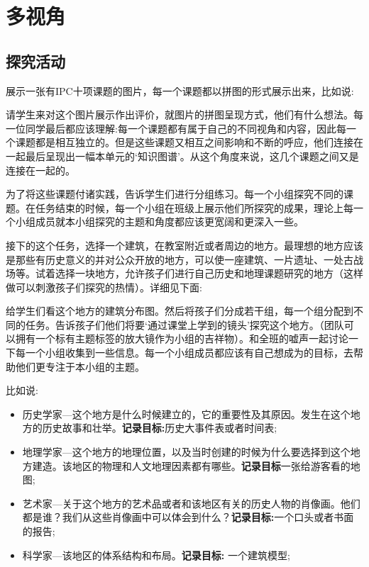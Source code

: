 \chapter{多视角}
    

\section{探究活动}
    展示一张有IPC十项课题的图片，每一个课题都以拼图的形式展示出来，比如说:\par
    请学生来对这个图片展示作出评价，就图片的拼图呈现方式，他们有什么想法。每一位同学最后都应该理解:每一个课题都有属于自己的不同视角和内容，因此每一个课题都是相互独立的。但是这些课题又相互之间影响和不断的呼应，他们连接在一起最后呈现出一幅本单元的‘知识图谱’。从这个角度来说，这几个课题之间又是连接在一起的。\par
    为了将这些课题付诸实践，告诉学生们进行分组练习。每一个小组探究不同的课题。在任务结束的时候，每一个小组在班级上展示他们所探究的成果，理论上每一个小组成员就本小组探究的主题和角度都应该更宽阔和更深入一些。\par
    接下的这个任务，选择一个建筑，在教室附近或者周边的地方。最理想的地方应该是那些有历史意义的并对公众开放的地方，可以使一座建筑、一片遗址、一处古战场等。试着选择一块地方，允许孩子们进行自己历史和地理课题研究的地方（这样做可以刺激孩子们探究的热情）。详细见下面:    \par
    给学生们看这个地方的建筑分布图。然后将孩子们分成若干组，每一个组分配到不同的任务。告诉孩子们他们将要‘通过课堂上学到的镜头’探究这个地方。（团队可以拥有一个标有主题标签的放大镜作为小组的吉祥物）。和全班的嘘声一起讨论一下每一个小组收集到一些信息。每一个小组成员都应该有自己想成为的目标，去帮助他们更专注于本小组的主题。\par
    比如说:\par
    \begin{itemize}
      \item 历史学家---这个地方是什么时候建立的，它的重要性及其原因。发生在这个地方的历史故事和壮举。\textbf{记录目标:}历史大事件表或者时间表;
      \item 地理学家---这个地方的地理位置，以及当时创建的时候为什么要选择到这个地方建造。该地区的物理和人文地理因素都有哪些。\textbf{记录目标}一张给游客看的地图;
      \item  艺术家---关于这个地方的艺术品或者和该地区有关的历史人物的肖像画。他们都是谁？我们从这些肖像画中可以体会到什么？\textbf{记录目标:}一个口头或者书面的报告;
      \item 科学家---该地区的体系结构和布局。\textbf{记录目标:}  一个建筑模型;
    \end{itemize}  
      
